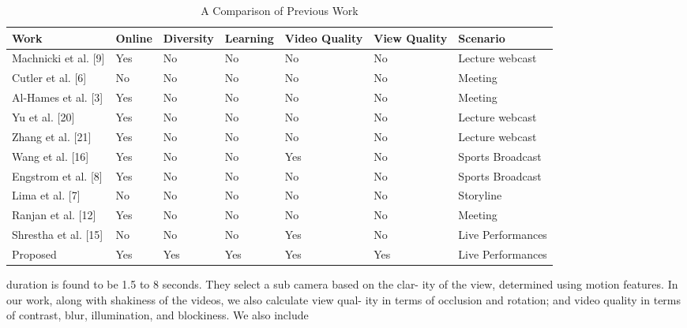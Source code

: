 \documentclass{sig-alternate}
\begin{document}
\begin{center}
\begin{table}[ht]
\centering
\caption{A Comparison of Previous Work}
\label{my-label}
\begin{tabular}{l|l|l|l|l|l|l}
\hline
Work                     & Online & Diversity & Learning & Video Quality & View Quality & Scenario          \\ \hline
Machnicki et al. {[}9{]} & Yes    & No        & No       & No            & No           & Lecture webcast   \\ \hline
Cutler et al. {[}6{]}    & No     & No        & No       & No            & No           & Meeting           \\ \hline
Al-Hames et al. {[}3{]}  & Yes    & No        & No       & No            & No           & Meeting           \\ \hline
Yu et al. {[}20{]}       & Yes    & No        & No       & No            & No           & Lecture webcast   \\ \hline
Zhang et al. {[}21{]}    & Yes    & No        & No       & No            & No           & Lecture webcast   \\ \hline
Wang et al. {[}16{]}     & Yes    & No        & No       & Yes           & No           & Sports Broadcast  \\ \hline
Engstrom et al. {[}8{]}  & Yes    & No        & No       & No            & No           & Sports Broadcast  \\ \hline
Lima et al. {[}7{]}      & No     & No        & No       & No            & No           & Storyline         \\ \hline
Ranjan et al. {[}12{]}   & Yes    & No        & No       & No            & No           & Meeting           \\ \hline
Shrestha et al. {[}15{]} & No     & No        & No       & Yes           & No           & Live Performances \\ \hline
Proposed                 & Yes    & Yes       & Yes      & Yes           & Yes          & Live Performances \\ \hline
\end{tabular}
\end{table} 
\end{center}
duration is found
to be 1.5 to 8 seconds. They select a sub camera based on the clar-
ity of the view, determined using motion features. In our work,
along with shakiness of the videos, we also calculate view qual-
ity in terms of occlusion and rotation; and video quality in terms
of contrast, blur, illumination, and blockiness. We also include
\end{document}
